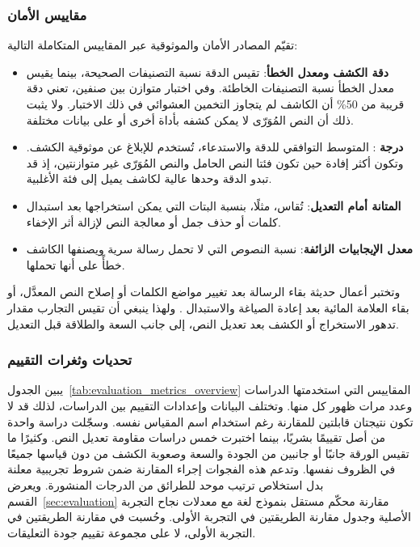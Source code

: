 \subsubsection{مقاييس الأمان}

تقيّم المصادر الأمان والموثوقية عبر المقاييس المتكاملة التالية:
\begin{itemize}
  \item \textbf{دقة الكشف ومعدل الخطأ}: تقيس الدقة نسبة التصنيفات الصحيحة، بينما يقيس معدل الخطأ نسبة التصنيفات الخاطئة. وفي اختبار متوازن بين صنفين، تعني دقة قريبة من 50\% أن الكاشف لم يتجاوز التخمين العشوائي في ذلك الاختبار. ولا يثبت ذلك أن النص المُوَرّى لا يمكن كشفه بأداة أخرى أو على بيانات مختلفة.
  \item \textbf{درجة }: المتوسط التوافقي للدقة والاستدعاء، تُستخدم للإبلاغ عن موثوقية الكشف. وتكون أكثر إفادة حين تكون فئتا النص الحامل والنص المُوَرّى غير متوازنتين، إذ قد تبدو الدقة وحدها عالية لكاشف يميل إلى فئة الأغلبية.
  \item \textbf{المتانة أمام التعديل}: تُقاس، مثلًا، بنسبة البتات التي يمكن استخراجها بعد استبدال كلمات أو حذف جمل أو معالجة النص لإزالة أثر الإخفاء.
  \item \textbf{معدل الإيجابيات الزائفة}: نسبة النصوص التي لا تحمل رسالة سرية ويصنفها الكاشف خطأً على أنها تحملها.
\end{itemize}

وتختبر أعمال حديثة بقاء الرسالة بعد تغيير مواضع الكلمات أو إصلاح النص المعدَّل، أو بقاء العلامة المائية بعد إعادة الصياغة والاستبدال \cite{lin2025positionagnostic,chen2025activetwo,wang2025contrastive}. ولهذا ينبغي أن تقيس التجارب مقدار تدهور الاستخراج أو الكشف بعد تعديل النص، إلى جانب السعة والطلاقة قبل التعديل.

\subsubsection{تحديات وثغرات التقييم}

يبين الجدول~\ref{tab:evaluation_metrics_overview} المقاييس التي استخدمتها الدراسات وعدد مرات ظهور كل منها. وتختلف البيانات وإعدادات التقييم بين الدراسات، لذلك قد لا تكون نتيجتان قابلتين للمقارنة رغم استخدام اسم المقياس نفسه. وسجّلت دراسة واحدة من أصل  تقييمًا بشريًا، بينما اختبرت خمس دراسات مقاومة تعديل النص. وكثيرًا ما تقيس الورقة جانبًا أو جانبين من الجودة والسعة وصعوبة الكشف من دون قياسها جميعًا في الظروف نفسها. وتدعم هذه الفجوات إجراء المقارنة ضمن شروط تجريبية معلنة بدل استخلاص ترتيب موحد للطرائق من الدرجات المنشورة.
ويعرض القسم~\ref{sec:evaluation} مقارنة محكّم مستقل بنموذج لغة مع معدلات نجاح التجربة الأصلية وجدول مقارنة الطريقتين في التجربة الأولى. وحُسبت  في مقارنة الطريقتين في التجربة الأولى، لا على مجموعة تقييم جودة التعليقات.

